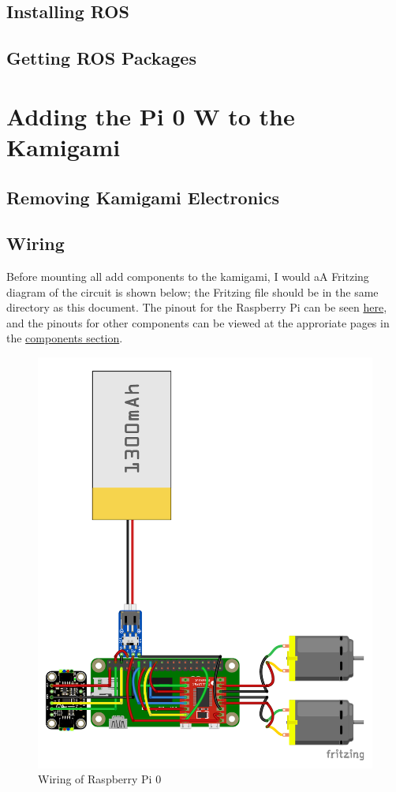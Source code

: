 \documentclass[11pt]{article}
\begin{document}
\subsection{Installing ROS}

\subsection{Getting ROS Packages}

\section{Adding the Pi 0 W to the Kamigami}

\subsection{Removing Kamigami Electronics}

\subsection{Wiring}

Before mounting all add components to the kamigami, I would aA Fritzing diagram of the circuit is shown below; the Fritzing file should be in the same directory as this document.
The pinout for the Raspberry Pi can be seen \href{https://pinout.xyz}{here},
and the pinouts for other components can be viewed at the approriate pages in the \hyperref[components]{components section}.

\begin{figure}[H]
    \centering
    \includegraphics[width=.75\textwidth]{images/wiring.pdf}
    \caption{Wiring of Raspberry Pi 0}
    \label{fig:wiring}
\end{figure}
\end{document}
